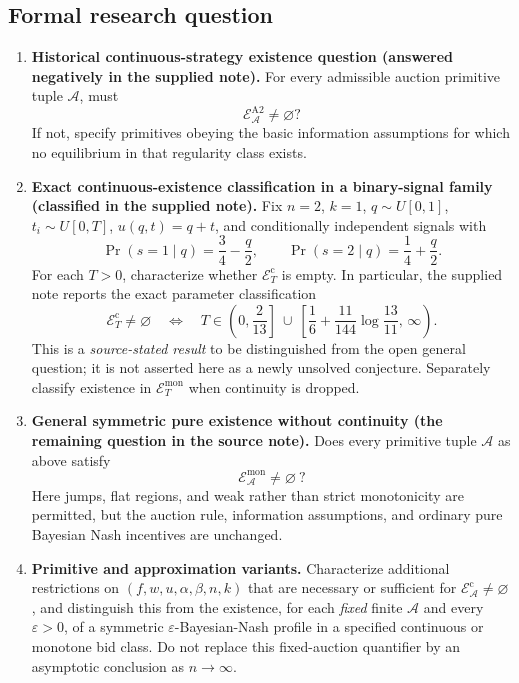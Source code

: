 \documentclass[11pt,a4paper]{article}
\begin{document}
\subsection*{Formal research question}

\begin{enumerate}[label=\textbf{(\alph*)},leftmargin=2.5em]
	\item \textbf{Historical continuous-strategy existence question
		(answered negatively in the supplied note).}
	For every admissible auction primitive tuple $\mathcal A$, must
	\[
	\mathcal E_{\mathcal A}^{\mathrm{A2}}\ne\varnothing?
	\]
	If not, specify primitives obeying the basic information assumptions
	for which no equilibrium in that regularity class exists.
	
	\item \textbf{Exact continuous-existence classification in a binary-signal
		family (classified in the supplied note).}
	Fix $n=2$, $k=1$, $q\sim U[0,1]$,
	$t_i\sim U[0,T]$, $u(q,t)=q+t$, and conditionally independent signals
	with
	\[
	\Pr(s=1\mid q)=\frac34-\frac q2,\qquad
	\Pr(s=2\mid q)=\frac14+\frac q2.
	\]
	For each $T>0$, characterize whether
	$\mathcal E_T^{\mathrm c}$ is empty. In particular, the supplied
	note reports the exact parameter classification
	\[
	\mathcal E_T^{\mathrm c}\ne\varnothing
	\quad\Longleftrightarrow\quad
	T\in\left(0,\frac{2}{13}\right]
	\ \cup\
	\left[\frac16+\frac{11}{144}\log\!\frac{13}{11},\,\infty\right).
	\]
	This is a \emph{source-stated result} to be distinguished from the
	open general question; it is not asserted here as a newly unsolved
	conjecture. Separately classify existence in
	$\mathcal E_T^{\mathrm{mon}}$ when continuity is dropped.
	
	\item \textbf{General symmetric pure existence without continuity
		(the remaining question in the source note).}
	Does every primitive tuple $\mathcal A$ as above satisfy
	\[
	\boxed{\quad\mathcal E_{\mathcal A}^{\mathrm{mon}}
		\ne\varnothing\ ?\quad}
	\]
	Here jumps, flat regions, and weak rather than strict monotonicity are
	permitted, but the auction rule, information assumptions, and ordinary
	pure Bayesian Nash incentives are unchanged.
	
	\item \textbf{Primitive and approximation variants.}
	Characterize additional restrictions on $(f,w,u,\alpha,\beta,n,k)$
	that are necessary or sufficient for
	$\mathcal E_{\mathcal A}^{\mathrm c}\ne\varnothing$, and distinguish
	this from the existence, for each \emph{fixed} finite $\mathcal A$
	and every $\varepsilon>0$, of a symmetric
	$\varepsilon$-Bayesian-Nash profile in a specified continuous or
	monotone bid class. Do not replace this fixed-auction quantifier by
	an asymptotic conclusion as $n\to\infty$.
\end{enumerate}
\end{document}
